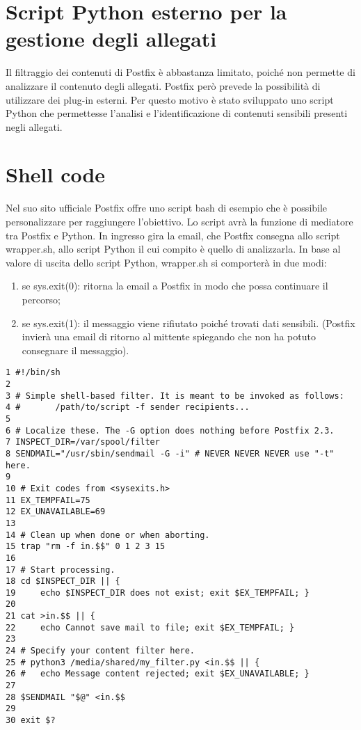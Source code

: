     \section{Script Python esterno per la gestione degli allegati}
    Il filtraggio dei contenuti di Postfix è abbastanza limitato, poiché non permette di analizzare il contenuto
    degli allegati. Postfix però prevede la possibilità di utilizzare dei plug-in esterni. Per questo motivo è stato
    sviluppato uno script Python che permettesse l'analisi e l'identificazione di contenuti sensibili presenti 
    negli allegati.


    \section{Shell code}
    Nel suo sito ufficiale Postfix offre uno script bash di esempio che è possibile personalizzare per  
    raggiungere l'obiettivo. Lo script avrà la funzione di mediatore tra Postfix e Python. 
    In ingresso gira la email, che Postfix consegna allo script wrapper.sh, allo script Python 
    il cui compito è quello di analizzarla.
    In base al valore di uscita dello script Python, wrapper.sh si comporterà in due modi:

    
    \begin{enumerate}
        \item se sys.exit(0): ritorna la email a Postfix in modo che possa continuare il percorso;
        \item se sys.exit(1): il messaggio viene rifiutato poiché trovati dati sensibili. (Postfix invierà una 
        email di ritorno al mittente spiegando che non ha potuto consegnare il messaggio). 
    \end{enumerate}

    \begin{verbatim}
1 #!/bin/sh
2 
3 # Simple shell-based filter. It is meant to be invoked as follows:
4 #       /path/to/script -f sender recipients...
5 
6 # Localize these. The -G option does nothing before Postfix 2.3.
7 INSPECT_DIR=/var/spool/filter
8 SENDMAIL="/usr/sbin/sendmail -G -i" # NEVER NEVER NEVER use "-t" here.
9 
10 # Exit codes from <sysexits.h>
11 EX_TEMPFAIL=75
12 EX_UNAVAILABLE=69
13 
14 # Clean up when done or when aborting.
15 trap "rm -f in.$$" 0 1 2 3 15
16 
17 # Start processing.
18 cd $INSPECT_DIR || {
19     echo $INSPECT_DIR does not exist; exit $EX_TEMPFAIL; }
20 
21 cat >in.$$ || { 
22     echo Cannot save mail to file; exit $EX_TEMPFAIL; }
23 
24 # Specify your content filter here.
25 # python3 /media/shared/my_filter.py <in.$$ || {
26 #   echo Message content rejected; exit $EX_UNAVAILABLE; }
27 
28 $SENDMAIL "$@" <in.$$
29 
30 exit $?
    \end{verbatim}

